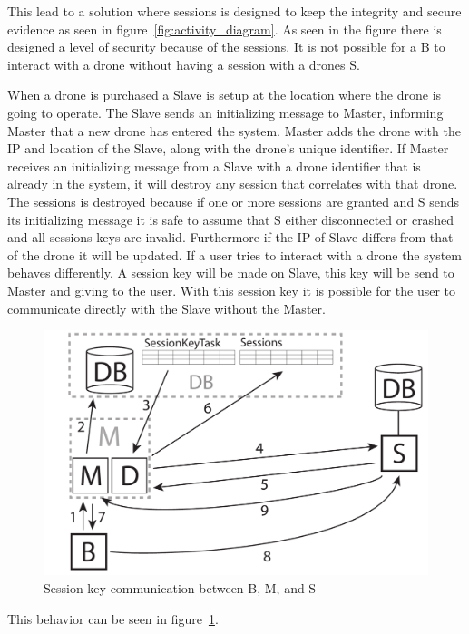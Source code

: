 This lead to a solution where sessions is designed to keep the integrity and secure evidence as seen in figure~\ref{fig:activity_diagram}. 
As seen in the figure there is designed a level of security because of the sessions. It is not possible for a B to interact with a drone without having a session with a drones S.

When a drone is purchased a Slave is setup at the location where the drone is going to operate.
The Slave sends an initializing message to Master, informing Master that a new drone has entered the system.
Master adds the drone with the IP and location of the Slave, along with the drone's unique identifier.
If Master receives an initializing message from a Slave with a drone identifier that is already in the system, it will destroy any session that correlates with that drone. The sessions is destroyed because if one or more sessions are granted and S sends its initializing message it is safe to assume that S either disconnected or crashed and all sessions keys are invalid.
Furthermore if the IP of Slave differs from that of the drone it will be updated.
If a user tries to interact with a drone the system behaves differently. A session key will be made on Slave, this key will be send to Master and giving to the user. With this session key it is possible for the user to communicate directly with the Slave without the Master.

\begin{figure}[!h]
    \centering 
    \includegraphics[width=\textwidth]{gfx/sessionkey_communication.pdf}
    \caption{Session key communication between B, M, and S}
    \label{fig:sessionkey_communication}
\end{figure}

This behavior can be seen in figure~\ref{fig:sessionkey_communication}. 

